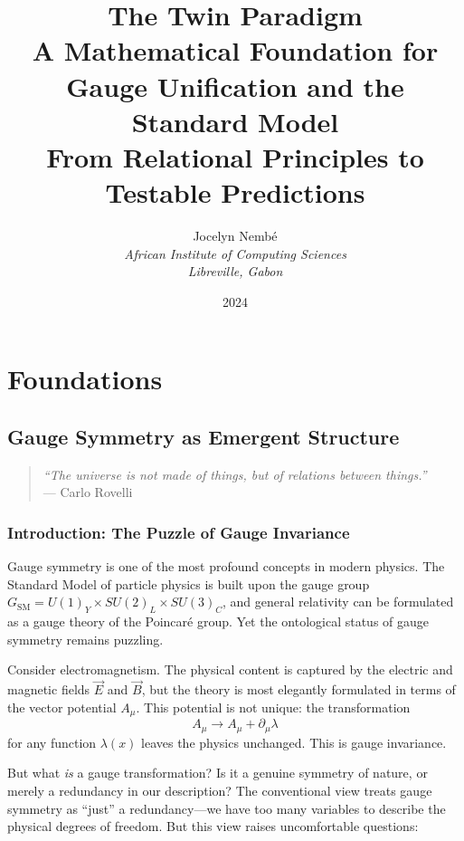 \documentclass[11pt,a4paper,openright]{book}
\title{
\vspace{-2cm}
{\Huge\bfseries The Twin Paradigm}\\[1cm]
{\LARGE A Mathematical Foundation for\\[0.3cm] Gauge Unification and the Standard Model}\\[2cm]
{\large From Relational Principles to Testable Predictions}
}
\author{
{\Large Jocelyn Nembé}\\[0.5cm]
\textit{African Institute of Computing Sciences}\\
\textit{Libreville, Gabon}
}
\date{2024}
\theoremstyle{plain}
\theoremstyle{definition}
\newcommand{\SM}{\mathrm{SM}}
\begin{document}
\frontmatter
\maketitle
\tableofcontents

\mainmatter

\part{Foundations}

\chapter{Gauge Symmetry as Emergent Structure}
\label{ch:foundations}

\begin{quote}
\textit{``The universe is not made of things, but of relations between things.''}\\
--- Carlo Rovelli
\end{quote}

\section{Introduction: The Puzzle of Gauge Invariance}

Gauge symmetry is one of the most profound concepts in modern physics. The Standard Model of particle physics is built upon the gauge group $G_{\SM} = U(1)_Y \times SU(2)_L \times SU(3)_C$, and general relativity can be formulated as a gauge theory of the Poincaré group. Yet the ontological status of gauge symmetry remains puzzling.

Consider electromagnetism. The physical content is captured by the electric and magnetic fields $\vec{E}$ and $\vec{B}$, but the theory is most elegantly formulated in terms of the vector potential $A_\mu$. This potential is not unique: the transformation
\begin{equation}
A_\mu \to A_\mu + \partial_\mu \lambda
\end{equation}
for any function $\lambda(x)$ leaves the physics unchanged. This is gauge invariance.

But what \emph{is} a gauge transformation? Is it a genuine symmetry of nature, or merely a redundancy in our description? The conventional view treats gauge symmetry as ``just'' a redundancy---we have too many variables to describe the physical degrees of freedom. But this view raises uncomfortable questions:
\end{document}
